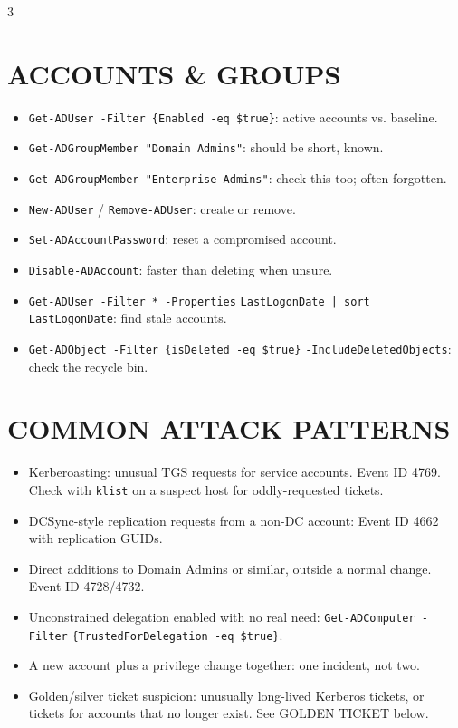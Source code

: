 \documentclass[7pt,landscape]{article}
\begin{document}
\begin{multicols*}{3}
\section{ACCOUNTS \& GROUPS}
\begin{itemize}
    \item \texttt{Get-ADUser -Filter \{Enabled -eq \$true\}}: active accounts vs. baseline.
    \item \texttt{Get-ADGroupMember "Domain Admins"}: should be short, known.
    \item \texttt{Get-ADGroupMember "Enterprise Admins"}: check this too; often forgotten.
    \item \texttt{New-ADUser} / \texttt{Remove-ADUser}: create or remove.
    \item \texttt{Set-ADAccountPassword}: reset a compromised account.
    \item \texttt{Disable-ADAccount}: faster than deleting when unsure.
    \item \texttt{Get-ADUser -Filter * -Properties} \newline \texttt{LastLogonDate | sort LastLogonDate}: find stale accounts.
    \item \texttt{Get-ADObject -Filter \{isDeleted -eq \$true\}} \newline \texttt{-IncludeDeletedObjects}: check the recycle bin.
\end{itemize}

\section{COMMON ATTACK PATTERNS}
\begin{itemize}
    \item Kerberoasting: unusual TGS requests for service accounts. Event ID 4769. Check with \texttt{klist} on a suspect host for oddly-requested tickets.
    \item DCSync-style replication requests from a non-DC account: Event ID 4662 with replication GUIDs.
    \item Direct additions to Domain Admins or similar, outside a normal change. Event ID 4728/4732.
    \item Unconstrained delegation enabled with no real need: \texttt{Get-ADComputer -Filter} \newline \texttt{\{TrustedForDelegation -eq \$true\}}.
    \item A new account plus a privilege change together: one incident, not two.
    \item Golden/silver ticket suspicion: unusually long-lived Kerberos tickets, or tickets for accounts that no longer exist. See GOLDEN TICKET below.
\end{itemize}


\end{multicols*}
\end{document}
